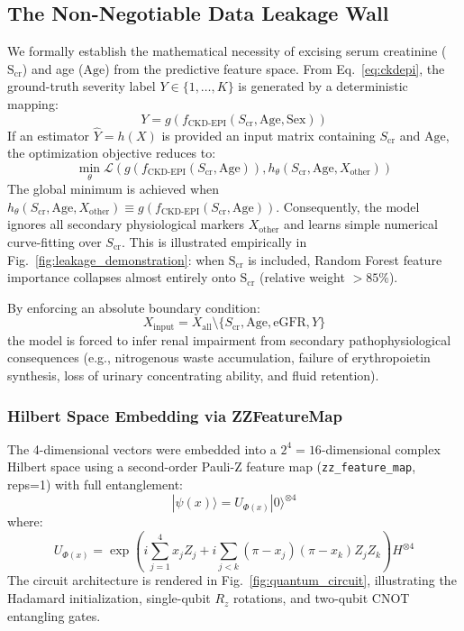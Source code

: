 \documentclass[conference]{IEEEtran}
\begin{document}
\subsection{The Non-Negotiable Data Leakage Wall}
We formally establish the mathematical necessity of excising serum creatinine ($\text{S}_{\text{cr}}$) and age ($\text{Age}$) from the predictive feature space. From Eq.~\ref{eq:ckdepi}, the ground-truth severity label $Y \in \{1, \dots, K\}$ is generated by a deterministic mapping:
\begin{equation}
Y = g\left( f_{\text{CKD-EPI}}(S_{\text{cr}}, \text{Age}, \text{Sex}) \right)
\end{equation}
If an estimator $\hat{Y} = h(X)$ is provided an input matrix containing $S_{\text{cr}}$ and $\text{Age}$, the optimization objective reduces to:
\begin{equation}
\min_\theta \mathcal{L}\left( g\left( f_{\text{CKD-EPI}}(S_{\text{cr}}, \text{Age}) \right), h_\theta(S_{\text{cr}}, \text{Age}, X_{\text{other}}) \right)
\end{equation}
The global minimum is achieved when $h_\theta(S_{\text{cr}}, \text{Age}, X_{\text{other}}) \equiv g(f_{\text{CKD-EPI}}(S_{\text{cr}}, \text{Age}))$. Consequently, the model ignores all secondary physiological markers $X_{\text{other}}$ and learns simple numerical curve-fitting over $S_{\text{cr}}$. This is illustrated empirically in Fig.~\ref{fig:leakage_demonstration}: when $\text{S}_{\text{cr}}$ is included, Random Forest feature importance collapses almost entirely onto $\text{S}_{\text{cr}}$ (relative weight $> 85\%$). 

By enforcing an absolute boundary condition:
\begin{equation}
X_{\text{input}} = X_{\text{all}} \setminus \{S_{\text{cr}}, \text{Age}, \text{eGFR}, Y\}
\end{equation}
the model is forced to infer renal impairment from secondary pathophysiological consequences (e.g., nitrogenous waste accumulation, failure of erythropoietin synthesis, loss of urinary concentrating ability, and fluid retention).



\subsubsection{Hilbert Space Embedding via ZZFeatureMap}
The 4-dimensional vectors were embedded into a $2^4 = 16$-dimensional complex Hilbert space using a second-order Pauli-Z feature map (\texttt{zz\_feature\_map}, reps=1) with full entanglement:
\begin{equation}
\label{eq:zz_feature_map}
|\psi(x)\rangle = U_{\Phi(x)} |0\rangle^{\otimes 4}
\end{equation}
where:
\begin{equation}
U_{\Phi(x)} = \exp\left( i \sum_{j=1}^4 x_j Z_j + i \sum_{j < k} (\pi - x_j)(\pi - x_k) Z_j Z_k \right) H^{\otimes 4}
\end{equation}
The circuit architecture is rendered in Fig.~\ref{fig:quantum_circuit}, illustrating the Hadamard initialization, single-qubit $R_z$ rotations, and two-qubit CNOT entangling gates.
\end{document}
